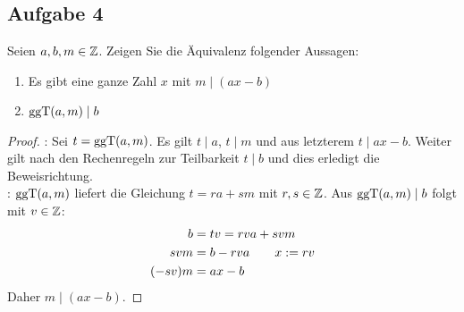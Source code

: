 \subsection{Aufgabe 4}
\label{70:4}
Seien $a,b,m \in \mathbb{Z}$. Zeigen Sie die Äquivalenz folgender Aussagen:
\begin{enumerate}[label=\roman*)]
  \item Es gibt eine ganze Zahl $x$ mit $m \mid (ax - b)$
  \item $\text{ggT}(a,m) \mid b$
\end{enumerate}
\begin{proof}
  : Sei $t = \text{ggT}(a,m)$. Es gilt $t \mid a$, $t \mid m$ und
  aus letzterem $t \mid ax - b$. Weiter gilt nach den Rechenregeln zur Teilbarkeit
  $t \mid b$ und dies erledigt die Beweisrichtung.\\
  : $\text{ggT}(a,m)$ liefert die Gleichung $t = ra + sm$
  mit $r,s \in \mathbb{Z}$. Aus $\text{ggT}(a,m) \mid b$ folgt mit $v \in \mathbb{Z}$:
  \begin{equation*}
    \begin{aligned}
      b      & = tv = rva + svm               \\
      svm    & = b - rva \qquad x := rv \\
      (-sv)m & = ax - b
    \end{aligned}
  \end{equation*}
  Daher $m \mid (ax - b)$.
\end{proof}

